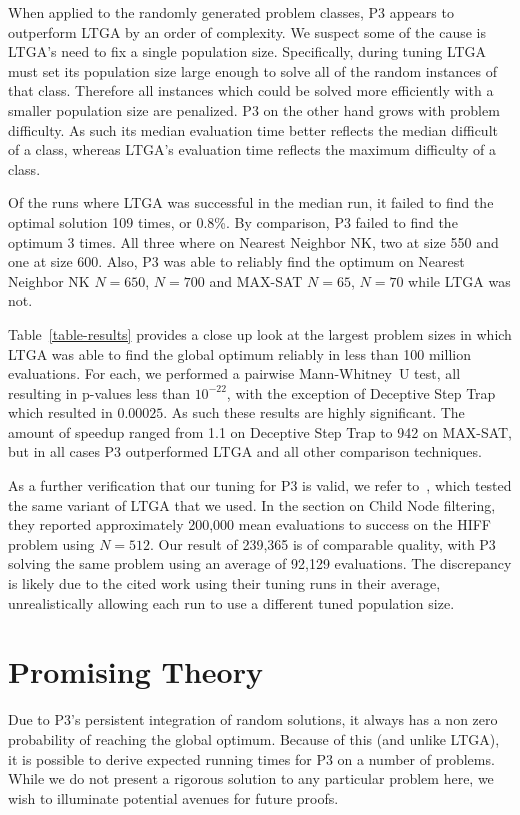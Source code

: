 \documentclass{sig-alternate}
\begin{document}
When applied to the randomly generated problem classes, P3 appears to outperform LTGA
by an order of complexity.  We suspect some of the cause is LTGA's need to fix
a single population size.  Specifically, during tuning LTGA must set its population
size large enough to solve all of the random instances of that class.  Therefore
all instances which could be solved more efficiently with a smaller population size
are penalized.  P3 on the other hand grows with problem difficulty.  As such its
median evaluation time better reflects the median difficult of a class, whereas LTGA's
evaluation time reflects the maximum difficulty of a class.

Of the runs where LTGA was successful in the median run, it failed to find the optimal solution
109 times, or 0.8\%.  By comparison, P3 failed to find the optimum 3 times.  All three
where on Nearest Neighbor NK, two at size 550 and one at size 600.  Also, P3 was able
to reliably find the optimum on Nearest Neighbor NK $N=650$, $N=700$ and MAX-SAT $N=65$, $N=70$
while LTGA was not.

Table~\ref{table-results} provides a close up look at the largest problem sizes
in which LTGA was able to find the global optimum reliably in less than 100 million
evaluations.  For each, we performed a pairwise Mann-Whitney~U test, all resulting
in p-values less than $10^{-22}$, with the exception of Deceptive Step Trap which
resulted in $0.00025$.  As such these results are highly significant.  The amount
of speedup ranged from 1.1 on Deceptive Step Trap to 942 on MAX-SAT, but in all
cases P3 outperformed LTGA and all other comparison techniques.

As a further verification that our tuning for P3 is valid, we refer
to~\cite{thierens:2013:ltgahiff}, which tested the same variant of LTGA that we
used.  In the section on Child Node filtering, they reported approximately 200,000
mean evaluations to success on the HIFF problem using $N=512$.  Our result of
239,365 is of comparable quality, with P3 solving the same problem using an average
of 92,129 evaluations.  The discrepancy is likely due to the cited work using
their tuning runs in their average, unrealistically allowing each run to use a different tuned population size.

\section{Promising Theory}
Due to P3's persistent integration of random solutions, it always has
a non zero probability of reaching the global optimum.  Because of
this (and unlike LTGA), it is possible to derive expected
running times for P3 on a number of problems.  While we do not present
a rigorous solution to any particular problem here, we wish to
illuminate potential avenues for future proofs.
\end{document}
